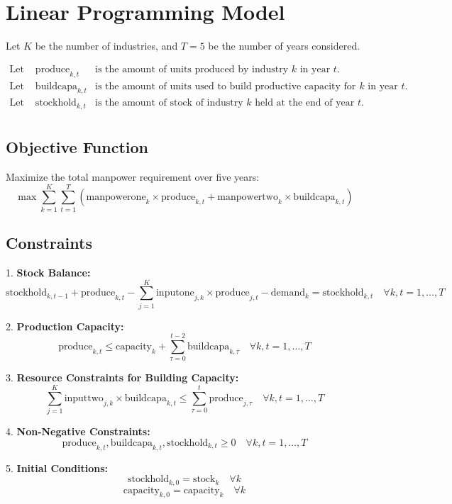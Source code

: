 \documentclass{article}
\begin{document}
\section*{Linear Programming Model}

Let \( K \) be the number of industries, and \( T = 5 \) be the number of years considered.

\begin{align*}
\text{Let } & \text{produce}_{k,t} & \text{is the amount of units produced by industry } k \text{ in year } t. \\
\text{Let } & \text{buildcapa}_{k,t} & \text{is the amount of units used to build productive capacity for industry } k \text{ in year } t. \\
\text{Let } & \text{stockhold}_{k,t} & \text{is the amount of stock of industry } k \text{ held at the end of year } t. \\
\end{align*}

\subsection*{Objective Function}
Maximize the total manpower requirement over five years:
\[
\max \sum_{k=1}^{K} \sum_{t=1}^{T} (\text{manpowerone}_k \times \text{produce}_{k,t} + \text{manpowertwo}_k \times \text{buildcapa}_{k,t})
\]

\subsection*{Constraints}

1. \textbf{Stock Balance:}
\[
\text{stockhold}_{k,t-1} + \text{produce}_{k,t} - \sum_{j=1}^{K} \text{inputone}_{j,k} \times \text{produce}_{j,t} - \text{demand}_k = \text{stockhold}_{k,t} \quad \forall k, t = 1, \ldots, T
\]

2. \textbf{Production Capacity:}
\[
\text{produce}_{k,t} \leq \text{capacity}_{k} + \sum_{\tau = 0}^{t-2} \text{buildcapa}_{k,\tau} \quad \forall k, t = 1, \ldots, T
\]

3. \textbf{Resource Constraints for Building Capacity:}
\[
\sum_{j=1}^{K} \text{inputtwo}_{j,k} \times \text{buildcapa}_{k,t} \leq \sum_{\tau = 0}^{t} \text{produce}_{j,\tau} \quad \forall k, t = 1, \ldots, T
\]

4. \textbf{Non-Negative Constraints:}
\[
\text{produce}_{k,t}, \text{buildcapa}_{k,t}, \text{stockhold}_{k,t} \geq 0 \quad \forall k, t = 1, \ldots, T
\]

5. \textbf{Initial Conditions:}
\[
\text{stockhold}_{k,0} = \text{stock}_k \quad \forall k
\]
\[
\text{capacity}_{k,0} = \text{capacity}_k \quad \forall k
\]
\end{document}
